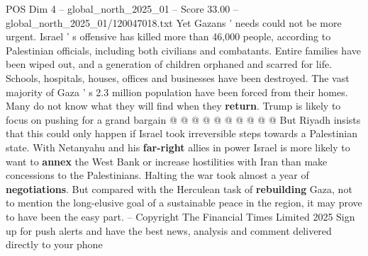 \begin{textsample}{POS Dim 4 – global\_north\_2025\_01 – Score 33.00 – global\_north\_2025\_01/120047018.txt}
Yet Gazans ' needs could not be more urgent.
Israel ' s offensive has killed more than 46,000 people, according to Palestinian officials, including both civilians and combatants.
Entire families have been wiped out, and a generation of children orphaned and scarred for life.
Schools, hospitals, houses, offices and businesses have been destroyed.
The vast majority of Gaza ' s 2.3 million population have been forced from their homes.
Many do not know what they will find when they \textbf{return}.
Trump is likely to focus on pushing for a grand bargain @ @ @ @ @ @ @ @ @ @ But Riyadh insists that this could only happen if Israel took irreversible steps towards a Palestinian state.
With Netanyahu and his \textbf{far-right} allies in power Israel is more likely to want to \textbf{annex} the West Bank or increase hostilities with Iran than make concessions to the Palestinians.
Halting the war took almost a year of \textbf{negotiations}.
But compared with the Herculean task of \textbf{rebuilding} Gaza, not to mention the long-elusive goal of a sustainable peace in the region, it may prove to have been the easy part. -- Copyright The Financial Times Limited 2025 Sign up for push alerts and have the best news, analysis and comment delivered directly to your phone

\end{textsample}
